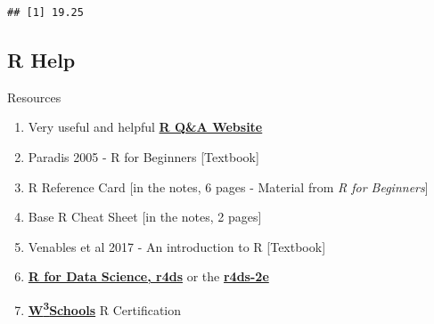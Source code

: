 \documentclass[
]{article}
\begin{document}
\begin{verbatim}
## [1] 19.25
\end{verbatim}

\subsection{R Help}\label{r-help}

Resources

\begin{enumerate}
\def\labelenumi{\arabic{enumi}.}
\item
  Very useful and helpful \href{http://stackexchange.com/}{\textbf{R
  Q\&A Website}}
\item
  Paradis 2005 - R for Beginners {[}Textbook{]}
\item
  R Reference Card {[}in the notes, 6 pages - Material from \emph{R for
  Beginners}{]}
\item
  Base R Cheat Sheet {[}in the notes, 2 pages{]}
\item
  Venables et al 2017 - An introduction to R {[}Textbook{]}
\item
  \href{https://r4ds.had.co.nz/index.html}{\textbf{R for Data Science,
  r4ds}} or the \href{https://r4ds.hadley.nz/}{\textbf{r4ds-2e}}
\item
  \href{https://www.w3schools.com/r/default.asp}{\textbf{W\textsuperscript{3}Schools}}
  R Certification
\end{enumerate}
\end{document}
